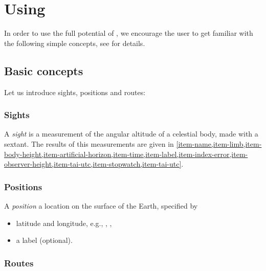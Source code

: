 \documentclass{ol-softwaremanual}
\begin{document}
\section{Using \thel}


In order to use the full potential of \thel, we encourage the user to get familiar with the following simple concepts, see \cite{bowditch2002the} for details. 

\subsection{Basic concepts}

Let us introduce sights, positions and routes: 
\subsubsection{Sights} \label{section-sights} 

A \textit{sight} is a measurement of the angular altitude of a celestial body, made with a sextant. 
The results of this measurements are given in  \cref{item-name,item-limb,item-body-height,item-artificial-horizon,item-time,item-label,item-index-error,item-observer-height,item-tai-utc,item-stopwatch,item-tai-utc}. 


\subsubsection{Positions}  \label{section-positions} 

A \textit{position} a  location on the surface of the Earth, specified by 
\begin{itemize}
\item latitude and longitude, e.g., , ,
\item a label (optional).
\end{itemize}
\subsubsection{Routes} \label{section-routes} 
\end{document}
